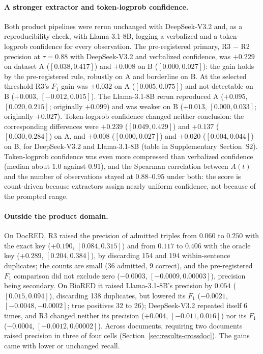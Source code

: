 \documentclass[preprint,12pt,authoryear]{elsarticle}
\begin{document}
\paragraph{A stronger extractor and token-logprob confidence.} Both
product pipelines were rerun unchanged with DeepSeek-V3.2 and, as a
reproducibility check, with Llama-3.1-8B, logging a verbalized and a
token-logprob confidence for every observation. The pre-registered
primary, R3 $-$ R2 precision at $\tau=0.88$ with DeepSeek-V3.2 and
verbalized confidence, was $+0.229$ on dataset A ($[0.038,\allowbreak 0.417]$) and
$+0.008$ on B ($[0.000,\allowbreak 0.027]$): the gain holds by the pre-registered
rule, robustly on A and borderline on B. At the selected threshold R3's
$F_1$ gain was $+0.032$ on A ($[0.005,\allowbreak 0.075]$) and not detectable on B
($+0.003$, $[-0.012,\allowbreak 0.015]$). The Llama-3.1-8B rerun reproduced A
($+0.095$, $[0.020,\allowbreak 0.215]$; originally $+0.099$) and was weaker on B
($+0.013$, $[0.000,\allowbreak 0.033]$; originally $+0.027$). Token-logprob
confidence changed neither conclusion: the corresponding differences were
$+0.239$ ($[0.049,\allowbreak 0.429]$) and $+0.137$ ($[0.030,\allowbreak 0.284]$) on A, and
$+0.008$ ($[0.000,\allowbreak 0.027]$) and $+0.020$ ($[0.004,\allowbreak 0.044]$) on B, for
DeepSeek-V3.2 and Llama-3.1-8B (table in Supplementary Section~S2).
Token-logprob confidence was even more compressed than verbalized
confidence (median about $1.0$ against $0.91$), and the Spearman
correlation between $A(t)$ and the number of observations stayed at
$0.88$--$0.95$ under both: the score is count-driven because extractors
assign nearly uniform confidence, not because of the prompted range.


\paragraph{Outside the product domain.} On DocRED, R3 raised the
precision of admitted triples from $0.060$ to $0.250$ with the exact key
($+0.190$, $[0.084,\allowbreak 0.315]$) and from $0.117$ to $0.406$ with the oracle
key ($+0.289$, $[0.204,\allowbreak 0.384]$), by discarding 154 and 194
within-sentence duplicates; the counts are small (36 admitted, 9
correct), and the pre-registered $F_1$ comparison did not exclude zero
($-0.0003$, $[-0.0009,\allowbreak 0.00003]$), precision being secondary. On BioRED
it raised Llama-3.1-8B's precision by $0.054$ ($[0.015,\allowbreak 0.094]$),
discarding 138 duplicates, but lowered its $F_1$ ($-0.0021$,
$[-0.0048,\allowbreak -0.0002]$; true positives 32 to 26); DeepSeek-V3.2 repeated
itself 6 times, and R3 changed neither its precision ($+0.004$,
$[-0.011,\allowbreak 0.016]$) nor its $F_1$ ($-0.0004$, $[-0.0012,\allowbreak 0.00002]$).
Across documents, requiring two documents raised precision in three of
four cells (Section~\ref{sec:results-crossdoc}). The gains came with
lower or unchanged recall.
\end{document}
